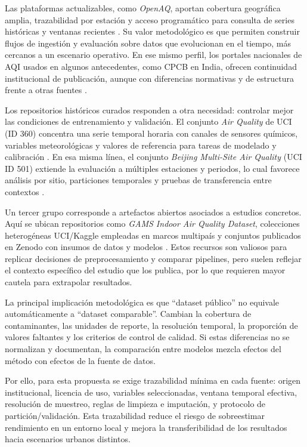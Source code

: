 Las plataformas actualizables, como \textit{OpenAQ}, aportan cobertura geográfica amplia, trazabilidad por estación y acceso programático para consulta de series históricas y ventanas recientes \cite{DATA_OPENAQ}. Su valor metodológico es que permiten construir flujos de ingestión y evaluación sobre datos que evolucionan en el tiempo, más cercanos a un escenario operativo. En ese mismo perfil, los portales nacionales de AQI usados en algunos antecedentes, como CPCB en India, ofrecen continuidad institucional de publicación, aunque con diferencias normativas y de estructura frente a otras fuentes \cite{A028}.

Los repositorios históricos curados responden a otra necesidad: controlar mejor las condiciones de entrenamiento y validación. El conjunto \textit{Air Quality} de UCI (ID 360) concentra una serie temporal horaria con canales de sensores químicos, variables meteorológicas y valores de referencia para tareas de modelado y calibración \cite{DATA_UCI_360}. En esa misma línea, el conjunto \textit{Beijing Multi-Site Air Quality} (UCI ID 501) extiende la evaluación a múltiples estaciones y periodos, lo cual favorece análisis por sitio, particiones temporales y pruebas de transferencia entre contextos \cite{DATA_UCI_501,A135}.

Un tercer grupo corresponde a artefactos abiertos asociados a estudios concretos. Aquí se ubican repositorios como \textit{GAMS Indoor Air Quality Dataset}, colecciones heterogéneas UCI/Kaggle empleadas en marcos multipaís y conjuntos publicados en Zenodo con insumos de datos y modelos \cite{A144,A178,A084}. Estos recursos son valiosos para replicar decisiones de preprocesamiento y comparar pipelines, pero suelen reflejar el contexto específico del estudio que los publica, por lo que requieren mayor cautela para extrapolar resultados.

La principal implicación metodológica es que ``dataset público'' no equivale automáticamente a ``dataset comparable''. Cambian la cobertura de contaminantes, las unidades de reporte, la resolución temporal, la proporción de valores faltantes y los criterios de control de calidad. Si estas diferencias no se normalizan y documentan, la comparación entre modelos mezcla efectos del método con efectos de la fuente de datos.

Por ello, para esta propuesta se exige trazabilidad mínima en cada fuente: origen institucional, licencia de uso, variables seleccionadas, ventana temporal efectiva, resolución de muestreo, reglas de limpieza e imputación, y protocolo de partición/validación. Esta trazabilidad reduce el riesgo de sobreestimar rendimiento en un entorno local y mejora la transferibilidad de los resultados hacia escenarios urbanos distintos.

